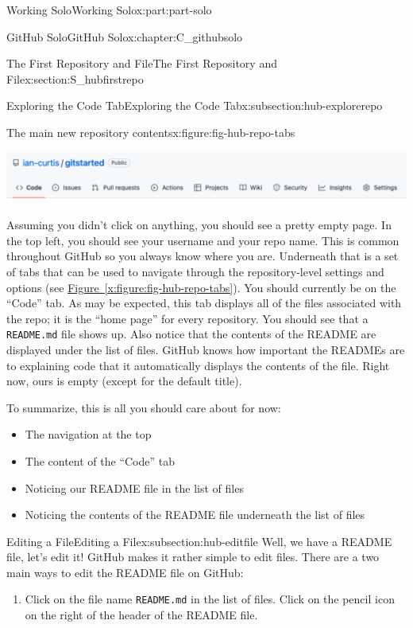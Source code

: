 \documentclass[oneside,10pt,]{book}
\newcommand{\xreffont}{\relax}
\newcommand{\mono}[1]{\texttt{#1}}
\begin{document}
\begin{partptx}{Working Solo}{}{Working Solo}{}{}{x:part:part-solo}
\begin{chapterptx}{GitHub Solo}{}{GitHub Solo}{}{}{x:chapter:C_githubsolo}
\begin{sectionptx}{The First Repository and File}{}{The First Repository and File}{}{}{x:section:S_hubfirstrepo}
\begin{subsectionptx}{Exploring the Code Tab}{}{Exploring the Code Tab}{}{}{x:subsection:hub-explorerepo}
\begin{figureptx}{The main new repository contents}{x:figure:fig-hub-repo-tabs}{}
\begin{image}{0.1}{0.8}{0.1}
\includegraphics[width=\linewidth]{external/hub_repo_tabs.pdf}
\end{image}%
\tcblower
\end{figureptx}%
Assuming you didn't click on anything, you should see a pretty empty page. In the top left, you should see your username and your repo name. This is common throughout GitHub so you always know where you are. Underneath that is a set of tabs that can be used to navigate through the repository-level settings and options (see \hyperref[x:figure:fig-hub-repo-tabs]{Figure~{\xreffont\ref{x:figure:fig-hub-repo-tabs}}}). You should currently be on the ``Code'' tab. As may be expected, this tab displays all of the files associated with the repo; it is the ``home page'' for every repository. You should see that a \mono{README.md} file shows up. Also notice that the contents of the README are displayed under the list of files. GitHub knows how important the READMEs are to explaining code that it automatically displays the contents of the file. Right now, ours is empty (except for the default title).%
\par
To summarize, this is all you should care about for now:%
\begin{itemize}[label=\textbullet]
\item{}The navigation at the top%
\item{}The content of the ``Code'' tab%
\item{}Noticing our README file in the list of files%
\item{}Noticing the contents of the README file underneath the list of files%
\end{itemize}
%
\end{subsectionptx}
%
%
\typeout{************************************************}
\typeout{************************************************}
%
\begin{subsectionptx}{Editing a File}{}{Editing a File}{}{}{x:subsection:hub-editfile}
%
Well, we have a README file, let's edit it! GitHub makes it rather simple to edit files. There are a two main ways to edit the README file on GitHub:%
\begin{enumerate}
\item{}Click on the file name \mono{README.md} in the list of files. Click on the pencil icon on the right of the header of the README file.%

\end{enumerate}
\end{subsectionptx}
\end{sectionptx}
\end{chapterptx}
\end{partptx}
\end{document}
